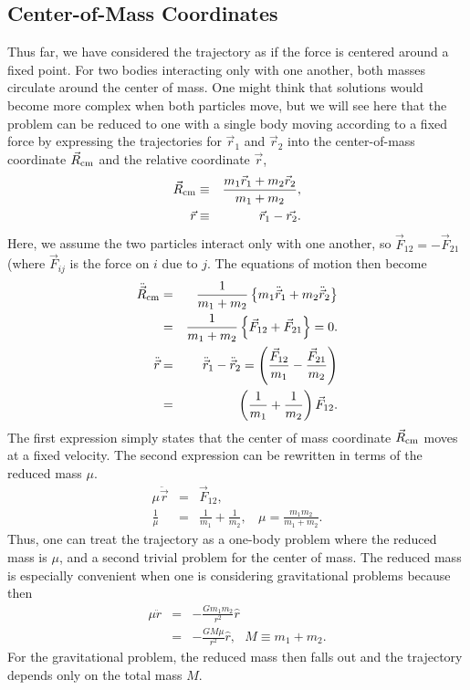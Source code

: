 \subsection{Center-of-Mass Coordinates}

Thus far, we have considered the trajectory as if the force is centered around a fixed point. For two bodies interacting only with one another, both masses circulate around the center of mass. One might think that solutions would become more complex when both particles move, but we will see here that the problem can be reduced to one with a single body moving according to a fixed force by expressing the trajectories for $\vec{r}_1$ and $\vec{r}_2$ into the center-of-mass coordinate $\vec{R}_{\rm cm}$ and the relative coordinate $\vec{r}$,
\begin{eqnarray}
\vec{R}_{\rm cm}&\equiv&\frac{m_1\vec{r}_1+m_2\vec{r}_2}{m_1+m_2},\\
\nonumber
\vec{r}&\equiv&\vec{r}_1-\vec{r_2}.
\end{eqnarray}
Here, we assume the two particles interact only with one another, so $\vec{F}_{12}=-\vec{F}_{21}$ (where $\vec{F}_{ij}$ is the force on $i$ due to $j$. The equations of motion then become
\begin{eqnarray}
\ddot{\vec{R}}_{\rm cm}&=&\frac{1}{m_1+m_2}\left\{m_1\ddot{\vec{r}}_1+m_2\ddot{\vec{r}}_2\right\}\\
\nonumber
&=&\frac{1}{m_1+m_2}\left\{\vec{F}_{12}+\vec{F}_{21}\right\}=0.\\
\ddot{\vec{r}}&=&\ddot{\vec{r}}_1-\ddot{\vec{r}}_2=\left(\frac{\vec{F}_{12}}{m_1}-\frac{\vec{F}_{21}}{m_2}\right)\\
\nonumber
&=&\left(\frac{1}{m_1}+\frac{1}{m_2}\right)\vec{F}_{12}.
\end{eqnarray}
The first expression simply states that the center of mass coordinate $\vec{R}_{\rm cm}$ moves at a fixed velocity. The second expression can be rewritten in terms of the reduced mass $\mu$.
\begin{eqnarray}
\mu \ddot{\vec{r}}&=&\vec{F}_{12},\\
\frac{1}{\mu}&=&\frac{1}{m_1}+\frac{1}{m_2},~~~~\mu=\frac{m_1m_2}{m_1+m_2}.
\end{eqnarray}
Thus, one can treat the trajectory as a one-body problem where the reduced mass is $\mu$, and a second trivial problem for the center of mass. The reduced mass is especially convenient when one is considering gravitational problems because then
\begin{eqnarray}
\mu \ddot{r}&=&-\frac{Gm_1m_2}{r^2}\hat{r}\\
\nonumber
&=&-\frac{GM\mu}{r^2}\hat{r},~~~M\equiv m_1+m_2.
\end{eqnarray}
For the gravitational problem, the reduced mass then falls out and the trajectory depends only on the total mass $M$.

